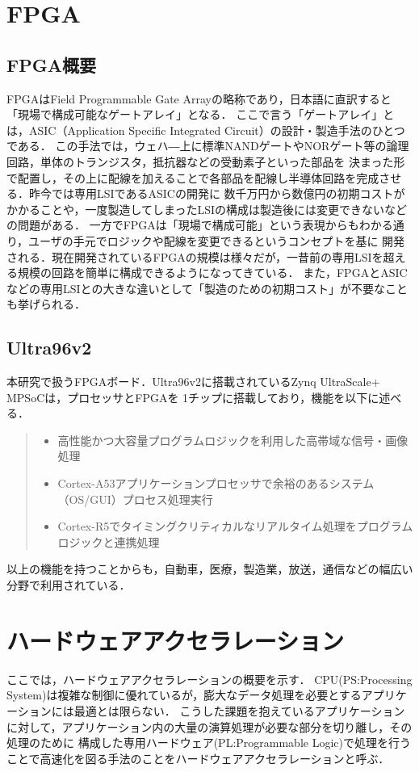 \documentclass[11pt,a4j]{jreport}
\begin{document}
\section{FPGA}
\subsection{FPGA概要}
FPGAはField Programmable Gate Arrayの略称であり，日本語に直訳すると「現場で構成可能なゲートアレイ」となる．
ここで言う「ゲートアレイ」とは，ASIC（Application Specific Integrated Circuit）の設計・製造手法のひとつである．
この手法では，ウェハ―上に標準NANDゲートやNORゲート等の論理回路，単体のトランジスタ，抵抗器などの受動素子といった部品を
決まった形で配置し，その上に配線を加えることで各部品を配線し半導体回路を完成させる．昨今では専用LSIであるASICの開発に
数千万円から数億円の初期コストがかかることや，一度製造してしまったLSIの構成は製造後には変更できないなどの問題がある．
一方でFPGAは「現場で構成可能」という表現からもわかる通り，ユーザの手元でロジックや配線を変更できるというコンセプトを基に
開発される．現在開発されているFPGAの規模は様々だが，一昔前の専用LSIを超える規模の回路を簡単に構成できるようになってきている．
また，FPGAとASICなどの専用LSIとの大きな違いとして「製造のための初期コスト」が不要なことも挙げられる．
\subsection{Ultra96v2}
本研究で扱うFPGAボード．Ultra96v2に搭載されているZynq UltraScale+ MPSoC\cite{boardinfo}は，プロセッサとFPGAを
1チップに搭載しており，機能を以下に述べる．
\begin{quote}
  \begin{itemize}
    \item 高性能かつ大容量プログラムロジックを利用した高帯域な信号・画像処理
    \item Cortex-A53アプリケーションプロセッサで余裕のあるシステム（OS/GUI）プロセス処理実行
    \item Cortex-R5でタイミングクリティカルなリアルタイム処理をプログラムロジックと連携処理
  \end{itemize}
\end{quote}
以上の機能を持つことからも，自動車，医療，製造業，放送，通信などの幅広い分野で利用されている．

\section{ハードウェアアクセラレーション}
ここでは，ハードウェアアクセラレーション\cite{HWAccel}の概要を示す．
CPU(PS:Processing System)は複雑な制御に優れているが，膨大なデータ処理を必要とするアプリケーションには最適とは限らない．
こうした課題を抱えているアプリケーションに対して，アプリケーション内の大量の演算処理が必要な部分を切り離し，その処理のために
構成した専用ハードウェア(PL:Programmable Logic)で処理を行うことで高速化を図る手法のことをハードウェアアクセラレーションと呼ぶ．
\end{document}
